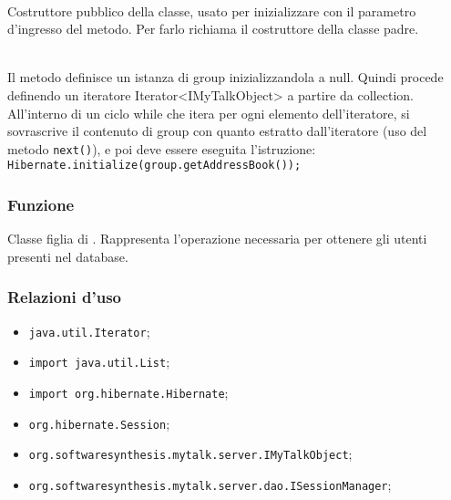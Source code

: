 \begin{description}
	\item{}\\
	Costruttore pubblico della classe, usato per inizializzare  con il parametro d'ingresso del metodo. Per farlo richiama il costruttore della classe padre.

	\item{}\\
	Il metodo definisce un istanza di  group inizializzandola a null. Quindi procede definendo un iteratore Iterator<IMyTalkObject> a partire da collection. All'interno di un ciclo while che itera per ogni elemento dell'iteratore, si sovrascrive il contenuto di group con quanto estratto dall'iteratore (uso del metodo \texttt{next()}), e poi deve essere eseguita l'istruzione:\\
	
	\verb|Hibernate.initialize(group.getAddressBook());|

\end{description}


\subsubsection*{Funzione}
Classe figlia di . Rappresenta l'operazione necessaria per ottenere gli utenti presenti nel database.

\subsubsection*{Relazioni d'uso}

\begin{itemize}
		\item \texttt{java.util.Iterator};
		\item \texttt{import java.util.List};
		\item \texttt{import org.hibernate.Hibernate};
		\item \texttt{org.hibernate.Session};
		\item \texttt{org.softwaresynthesis.mytalk.server.IMyTalkObject};
		\item \texttt{org.softwaresynthesis.mytalk.server.dao.ISessionManager};
\end{itemize}

